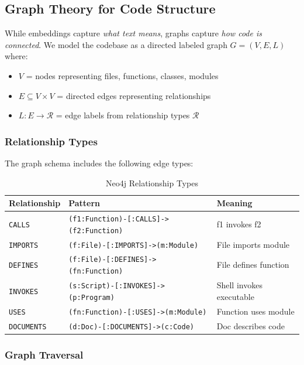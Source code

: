 \documentclass[11pt,letterpaper]{article}
\begin{document}
\subsection{Graph Theory for Code Structure}

While embeddings capture \textit{what text means}, graphs capture \textit{how code is connected}. We model the codebase as a directed labeled graph $G = (V, E, L)$ where:

\begin{itemize}
    \item $V$ = nodes representing files, functions, classes, modules
    \item $E \subseteq V \times V$ = directed edges representing relationships
    \item $L: E \rightarrow \mathcal{R}$ = edge labels from relationship types $\mathcal{R}$
\end{itemize}

\subsubsection{Relationship Types}

The graph schema includes the following edge types:

\begin{table}[H]
\centering
\caption{Neo4j Relationship Types}
\begin{tabular}{@{}lll@{}}
\toprule
\textbf{Relationship} & \textbf{Pattern} & \textbf{Meaning} \\
\midrule
\texttt{CALLS} & \texttt{(f1:Function)-[:CALLS]->(f2:Function)} & f1 invokes f2 \\
\texttt{IMPORTS} & \texttt{(f:File)-[:IMPORTS]->(m:Module)} & File imports module \\
\texttt{DEFINES} & \texttt{(f:File)-[:DEFINES]->(fn:Function)} & File defines function \\
\texttt{INVOKES} & \texttt{(s:Script)-[:INVOKES]->(p:Program)} & Shell invokes executable \\
\texttt{USES} & \texttt{(fn:Function)-[:USES]->(m:Module)} & Function uses module \\
\texttt{DOCUMENTS} & \texttt{(d:Doc)-[:DOCUMENTS]->(c:Code)} & Doc describes code \\
\bottomrule
\end{tabular}
\end{table}

\subsubsection{Graph Traversal}
\end{document}

